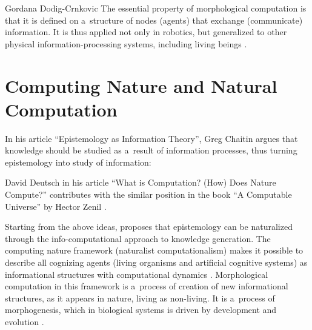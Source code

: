 \begin{artengenv}{Gordana Dodig-Crnkovic}
The essential property of morphological computation is that it is defined on a~structure of nodes (agents) that exchange (communicate) information. It is thus applied not only in robotics, but generalized to other physical information-processing systems, including living beings
\parencites[][]{dodig-crnkovic_development_2013}[][]{dodig-crnkovic_morphologically_2017}[][]{dodig-crnkovic_cognition_2018}.%


\section*{Computing Nature and Natural Computation}
In his article ``Epistemology as Information Theory'', Greg Chaitin argues that knowledge should be studied as a~result of information processes, thus turning epistemology into study of information:

David Deutsch in his article ``What is Computation? (How) Does Nature Compute?'' contributes with the similar position in the book ``A Computable Universe'' by Hector Zenil
\parencite*[][]{zenil_computable_2012}.%


Starting from the above ideas,
\parencite[][]{dodig-crnkovic_epistemology_2007} %
 proposes that epistemology can be naturalized through the info-computational approach to knowledge generation. The computing nature framework (naturalist computationalism) makes it possible to describe all cognizing agents (living organisms and artificial cognitive systems) as informational structures with computational dynamics 
\parencites[][]{dodig-crnkovic_dialogue_2011}[][]{dodig-crnkovic_computing_2013}[][]{dodig-crnkovic_modeling_2014}[][]{dodig-crnkovic_computational_2017}[][]{dodig-crnkovic_computing_2013}[][]{dodig-crnkovic_computational_2017}. %
 Morphological computation in this framework is a~process of creation of new informational structures, as it appears in nature, living as non-living. It is a~process of morphogenesis, which in biological systems is driven by development and evolution 
\parencites[][]{dodig-crnkovic_development_2013}[][]{dodig-crnkovic_morphologically_2017}[][]{dodig-crnkovic_cognition_2018}.%



\end{artengenv}
